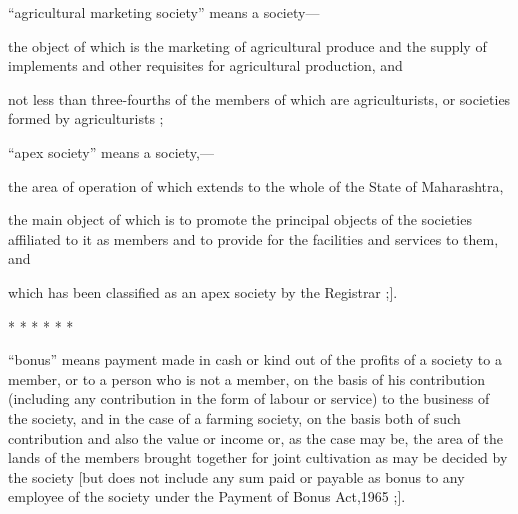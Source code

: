 \documentclass[reprint]{mhact}
\begin{document}
      \begin{subsectionlist}
         ``agricultural marketing society'' means a
        society---

        \begin{clause}

         the object of which is the marketing of
        agricultural produce and the supply of implements and other
        requisites for agricultural production, and

         not less than
        three-fourths of the members of which are agriculturists, or
        societies formed by agriculturists ;
      \end{clause}
      
        ``apex society'' means a society,---
      \begin{clause}
         the area of operation of which extends
        to the whole of the State of Maharashtra,

         the main object of which is to promote the
        principal objects of the societies affiliated to it as members
        and to provide for the facilities and services to them, and

         which has been classified as an
        apex society by the Registrar ;].
      \end{clause}
      

       *  * * * * *

       ``bonus'' means payment made in cash or kind out of
      the profits of a society to a member, or to a person who is not
      a member, on the basis of his contribution (including any
      contribution in the form of labour or service) to the business
      of the society, and in the case of a farming society, on the
      basis both of such contribution and also the value or income or,
      as the case may be, the area of the lands of the members brought
      together for joint cultivation as may be decided by the society
      [but does not include any sum paid or payable as bonus to any
      employee of the society under the Payment of Bonus Act,1965 ;].
    \end{subsectionlist} 


\end{document}
